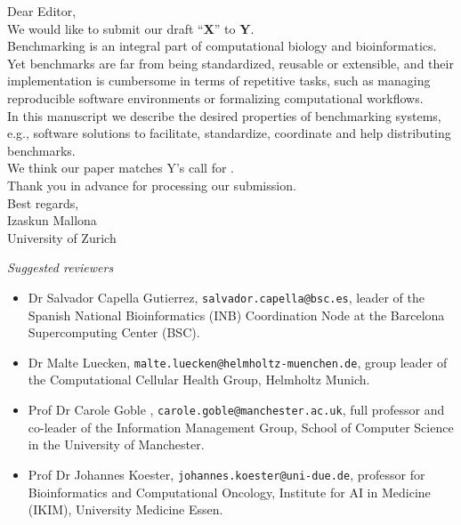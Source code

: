 \documentclass[a4paper]{article}
\newcommand{\submission}{X}
\newcommand{\journal}{Y}
\begin{document}
\noindent Dear Editor,\\

We would like to submit our draft ``\textbf{\submission}'' to \textbf{\journal}.\\

Benchmarking is an integral part of computational biology and bioinformatics. Yet benchmarks are far from being standardized, reusable or extensible, and their implementation is cumbersome in terms of repetitive tasks, such as managing reproducible software environments or formalizing computational workflows.\\ 

In this manuscript we describe the desired properties of benchmarking systems, e.g., software solutions to facilitate, standardize, coordinate and help distributing benchmarks.\\

We think our paper matches \journal's call for .\\

Thank you in advance for processing our submission. \\

Best regards,\\

Izaskun Mallona\\
\indent University of Zurich\\

\vspace{1cm}

\textit{Suggested reviewers}

\begin{itemize}
    \item Dr Salvador Capella Gutierrez, \texttt{salvador.capella@bsc.es}, leader of the Spanish National Bioinformatics (INB) Coordination Node at the Barcelona Supercomputing Center (BSC).
    \item Dr Malte Luecken, \texttt{malte.luecken@helmholtz-muenchen.de}, group leader of the Computational Cellular Health Group, Helmholtz Munich.
    \item Prof Dr Carole Goble , \texttt{carole.goble@manchester.ac.uk}, full professor and co-leader of the Information Management Group, School of Computer Science in the University of Manchester.
    \item Prof Dr Johannes Koester, \texttt{johannes.koester@uni-due.de}, professor for Bioinformatics and Computational Oncology, Institute for AI in Medicine (IKIM), University Medicine Essen.
\end{itemize}
\end{document}
